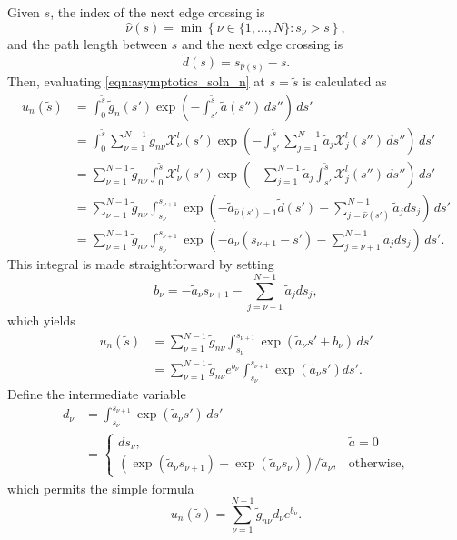 \documentclass[ms,cpyr,lof,lot]{uathesis}
\begin{document}
Given $s$, the index of the next edge crossing is
\begin{equation*}
  \hat{\nu}(s) = \min\left\{ \nu \in \{1,\ldots,N\} : s_\nu>s \right\},
\end{equation*}
and the path length between $s$ and the next edge crossing is
\begin{equation*}
  \tilde{d}(s) = s_{\hat{\nu}(s)}-s.
\end{equation*}
Then, evaluating \eqref{eqn:asymptotics_soln_n} at $s=\tilde{s}$ is calculated as
\begin{align*}
  u_n(\tilde{s}) &= \int_0^{\tilde{s}}\tilde{g}_n(s')\exp\left( -\int_{s'}^{\tilde{s}}\tilde{a}(s'')\,ds'' \right)\, ds' \\
  &= \int_0^{\tilde{s}} \sum_{\nu=1}^{N-1}\tilde{g}_{n\nu}\mathcal{X}^l_\nu(s') \exp\left( -\int_{s'}^{\tilde{s}}\sum_{j=1}^{N-1}\tilde{a}_{j}\mathcal{X}^l_j(s'')\,ds'' \right)\, ds' \\
  &= \sum_{\nu=1}^{N-1}\tilde{g}_{n\nu}\int_0^{\tilde{s}} \mathcal{X}^l_\nu(s') \exp\left( -\sum_{j=1}^{N-1}\tilde{a}_{j}\int_{s'}^{\tilde{s}}\mathcal{X}^l_j(s'')\,ds'' \right)\, ds' \\
  &= \sum_{\nu=1}^{N-1}\tilde{g}_{n\nu}\int_{s_\nu}^{s_{\nu+1}}  \exp\left(-\tilde{a}_{\hat{\nu}(s')-1}\tilde{d}(s') -\sum_{j=\hat{\nu}(s')}^{N-1}\tilde{a}_{j}ds_j\right)\, ds' \\
  &= \sum_{\nu=1}^{N-1}\tilde{g}_{n\nu}\int_{s_\nu}^{s_{\nu+1}}  \exp\left(-\tilde{a}_{\nu}(s_{\nu+1}-s') -\sum_{j=\nu+1}^{N-1}\tilde{a}_{j}ds_j\right)\, ds'.
\end{align*}
This integral is made straightforward by setting
\begin{equation*}
  b_\nu = -\tilde{a}_{\nu}s_{\nu+1} - \sum_{j=\nu+1}^{N-1}\tilde{a}_{j}ds_j,
\end{equation*}
which yields
\begin{align*}
  u_n(\tilde{s}) &= \sum_{\nu=1}^{N-1}\tilde{g}_{n\nu}\int_{s_\nu}^{s_{\nu+1}}  \exp\left(\tilde{a}_{\nu}s' + b_\nu\right)\, ds' \\
                 &= \sum_{\nu=1}^{N-1}\tilde{g}_{n\nu}e^{b_\nu}\int_{s_\nu}^{s_{\nu+1}}  \exp\left(\tilde{a}_{\nu}s'\right) ds'.
\end{align*}
Define the intermediate variable
\begin{align*}
  d_\nu &= \int_{s_\nu}^{s_{\nu+1}}  \exp\left(\tilde{a}_{\nu}s'\right)\, ds' \\
    &= \begin{cases}
    ds_\nu, & \tilde{a} = 0 \\
      \left( \exp(\tilde{a}_\nu s_{\nu+1}) - \exp(\tilde{a}_\nu s_\nu) \right)/\tilde{a}_\nu, & \mbox{otherwise},
    \end{cases}
\end{align*}
which permits the simple formula
\begin{equation}
  u_n(\tilde{s}) = \sum_{\nu=1}^{N-1} \tilde{g}_{n\nu}d_\nu e^{b_\nu}.
  \label{eqn:discrete_ray_integral}
\end{equation}
\end{document}

